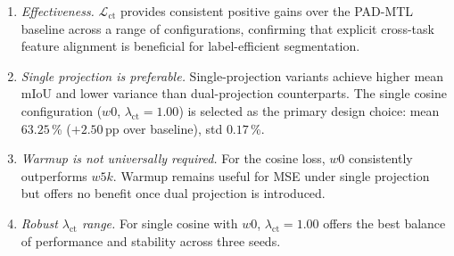 \begin{enumerate}
\item \textit{Effectiveness.} $\mathcal{L}_\text{ct}$ provides consistent
  positive gains over the PAD-MTL baseline across a range of
  configurations, confirming that explicit cross-task feature alignment
  is beneficial for label-efficient segmentation.

\item \textit{Single projection is preferable.} Single-projection variants
  achieve higher mean mIoU and lower variance than dual-projection
  counterparts.   The single cosine configuration ($w0$,
  $\lambda_\text{ct}=1.00$) is selected as the primary design choice:
  mean $63.25$\,\% ($+2.50$\,pp over baseline), std $0.17$\,\%.

\item \textit{Warmup is not universally required.} For the cosine loss,
  $w0$ consistently outperforms $w5k$. Warmup remains useful for MSE
  under single projection but offers no benefit once dual projection is
  introduced.

\item \textit{Robust $\lambda_\text{ct}$ range.} For single cosine with
  $w0$, $\lambda_\text{ct}=1.00$ offers the best balance of performance
  and stability across three seeds.
\end{enumerate}
